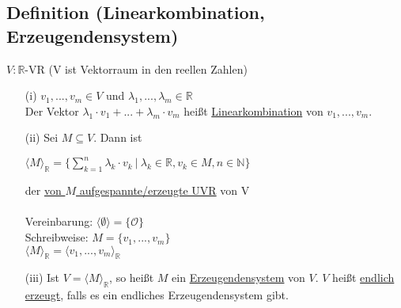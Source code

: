 \documentclass[a4paper, 12pt,titlepage, pdf, headsepline]{article}
\newcommand{\R}{\mathds{R}}
\newcommand{\uline}[1]{\underline{#1}}
\newcommand*\colvec[1]{
	\global\colveccount#1
	\begin{pmatrix}
		\colvecnext
	}
\def\colvecnext#1{
		#1
		\global\advance\colveccount-1
		\ifnum\colveccount>0
		\\
		\expandafter\colvecnext
		\else
	\end{pmatrix}
	\fi
}
\renewcommand{\>}{\rightarrow}
\renewcommand{\*}{\cdot}
\renewcommand{\vec}[1]{\colvec{#1}}
\begin{document}
\subsection{Definition (Linearkombination, Erzeugendensystem)}
$V: \R$-VR (V ist Vektorraum in den reellen Zahlen) \\
\begin{itemize}
	\item[(i)] $v_1, ... , v_m \in V$ und $\lambda_1,...,\lambda_m \in \R$\\ Der Vektor $\lambda_1 \* v_1 + ... + \lambda_m \* v_m$ heißt \uline{Linearkombination} von $v_1,...,v_m$.
	\item[(ii)] Sei $M \subseteq V$. Dann ist
	      \begin{center}
	      	$\langle M \rangle_{\R} = \big\{ \sum_{k = 1}^{n} \lambda_k \cdot v_k~ \big|~ \lambda_k \in \R, v_k \in M, n \in \mathds{N}\big\}$
	      \end{center}
	      der \underline{von $M$ aufgespannte/erzeugte UVR} von V \\
	      \\
	      Vereinbarung: $\langle \emptyset \rangle = \{\mathcal{O}\}$\\
	      Schreibweise: $M = \{v_1,...,v_m\}$\\
	      \noindent\hspace*{22mm}$\langle M \rangle_{\R} = \langle v_1,..., v_m\rangle_{\R} $
	\item[(iii)]
	      Ist $V = \langle M \rangle_{\R}$, so heißt $M$ ein \uline{Erzeugendensystem} von $V$. $V$ heißt \uline{endlich erzeugt}, falls es ein endliches Erzeugendensystem gibt.
\end{itemize}
\end{document}
